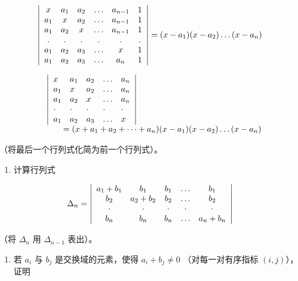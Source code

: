 \[
\left| \begin{array}{c c c c c c} x & a _ {1} & a _ {2} & \ldots & a _ {n - 1} & 1 \\ a _ {1} & x & a _ {2} & \ldots & a _ {n - 1} & 1 \\ a _ {1} & a _ {2} & x & \ldots & a _ {n - 1} & 1 \\ . & . & . & . & . & . \\ a _ {1} & a _ {2} & a _ {3} & \ldots & x & 1 \\ a _ {1} & a _ {2} & a _ {3} & \ldots & a _ {n} & 1 \end{array} \right| = (x - a _ {1}) (x - a _ {2}) \ldots (x - a _ {n})
\]

\[
\begin{array}{r l} & {\left| \begin{array}{l l l l l} x & a _ {1} & a _ {2} & \ldots & a _ {n} \\ a _ {1} & x & a _ {2} & \ldots & a _ {n} \\ a _ {1} & a _ {2} & x & \ldots & a _ {n} \\ \cdot & \cdot & \cdot & \cdot & \cdot \\ a _ {1} & a _ {2} & a _ {3} & \ldots & x \end{array} \right|} \\ & {\qquad = (x + a _ {1} + a _ {2} + \dots + a _ {n}) (x - a _ {1}) (x - a _ {2}) \ldots (x - a _ {n})} \end{array}
\]

（将最后一个行列式化简为前一个行列式）。

\begin{enumerate}
\def\labelenumi{\arabic{enumi}.}
\setcounter{enumi}{3}
\tightlist
\item
  计算行列式
\end{enumerate}

\[
\Delta_ {n} = \left| \begin{array}{c c c c c} a _ {1} + b _ {1} & b _ {1} & b _ {1} & \ldots & b _ {1} \\ b _ {2} & a _ {2} + b _ {2} & b _ {2} & \ldots & b _ {2} \\ \cdot & \cdot & \cdot & \cdot & \cdot \\ b _ {n} & b _ {n} & b _ {n} & \ldots & a _ {n} + b _ {n} \end{array} \right|
\]

（将 \(\Delta_{n}\) 用 \(\Delta_{n-1}\) 表出）。

\begin{enumerate}
\def\labelenumi{\arabic{enumi}.}
\setcounter{enumi}{4}
\tightlist
\item
  若 \(a_i\) 与 \(b_j\) 是交换域的元素，使得 \(a_i + b_j \neq 0\) （对每一对有序指标 \((i,j)\)），证明
\end{enumerate}

